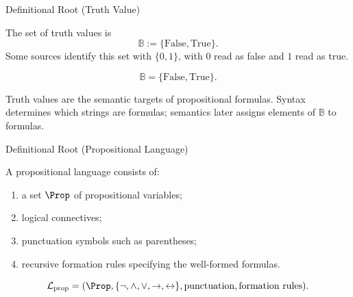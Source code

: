 \begin{definitionalbox}{Definitional Root (Truth Value)}
\begin{definition}
\label{def:truth-value-propositional-logic}
The set of truth values is
\[
\mathbb{B} := \{\mathrm{False},\mathrm{True}\}.
\]
Some sources identify this set with \(\{0,1\}\), with \(0\) read as false and \(1\) read as true.
\end{definition}
\end{definitionalbox}

\begin{remark*}
\[
\mathbb{B}=\{\mathrm{False},\mathrm{True}\}.
\]
\end{remark*}

\begin{remark*}[Interpretation]
Truth values are the semantic targets of propositional formulas. Syntax determines which strings are formulas; semantics later assigns elements of \(\mathbb{B}\) to formulas.
\end{remark*}

\DefinitionalRoot
\begin{definitionalbox}{Definitional Root (Propositional Language)}
\begin{definition}
\label{def:propositional-language}
A propositional language consists of:
\begin{enumerate}
\item a set \(\Prop\) of propositional variables;
\item logical connectives;
\item punctuation symbols such as parentheses;
\item recursive formation rules specifying the well-formed formulas.
\end{enumerate}
\end{definition}
\end{definitionalbox}

\begin{remark*}
\[
\mathcal L_{\mathrm{prop}}
=
(\Prop,\{\neg,\land,\lor,\to,\leftrightarrow\},\text{punctuation},\text{formation rules}).
\]
\end{remark*}

